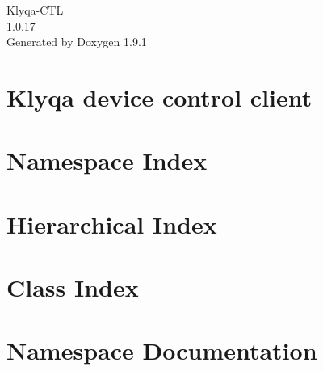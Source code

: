 \let\mypdfximage\pdfximage\def\pdfximage{\immediate\mypdfximage}\documentclass[twoside]{book}
\newcommand{\+}{\discretionary{\mbox{\scriptsize$\hookleftarrow$}}{}{}}
\newcommand{\clearemptydoublepage}{%
  \newpage{\pagestyle{empty}\cleardoublepage}%
}
\begin{document}
\raggedbottom

\hypersetup{pageanchor=false,
             bookmarksnumbered=true,
             pdfencoding=unicode
            }
\begin{titlepage}
\vspace*{7cm}
\begin{center}%
{\Large Klyqa-\/\+CTL \\[1ex]\large 1.\+0.\+17 }\\
\vspace*{1cm}
{\large Generated by Doxygen 1.9.1}\\
\end{center}
\end{titlepage}
\clearemptydoublepage
{}
\tableofcontents
\clearemptydoublepage
{}
\hypersetup{pageanchor=true}

\chapter{Klyqa device control client}
\label{md_README}

\chapter{Namespace Index}

\chapter{Hierarchical Index}

\chapter{Class Index}

\chapter{Namespace Documentation}


























\end{document}
